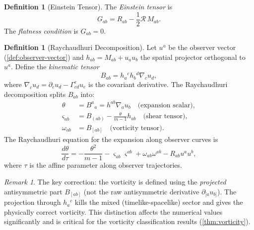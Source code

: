 \documentclass[11pt]{article}
\theoremstyle{definition}
\newtheorem{definition}[theorem]{Definition}
\theoremstyle{remark}
\newtheorem{remark}[theorem]{Remark}
\newcommand{\Met}{M}
\newcommand{\obs}{u}
\newcommand{\vort}{\omega}
\newcommand{\Chr}[2]{\Gamma^{#1}_{#2}}
\newcommand{\Ein}{G}
\newcommand{\Ric}{R}
\newcommand{\Scal}{\mathcal{R}}
\newcommand{\expan}{\theta}
\newcommand{\shear}{\varsigma} %
\begin{document}
\begin{definition}[Einstein Tensor]
\label{def:einstein}
The \emph{Einstein tensor} is
\begin{equation}
  \Ein_{ab} = \Ric_{ab} - \frac{1}{2} \Scal\, \Met_{ab}.
  \label{eq:einstein-tensor}
\end{equation}
The \emph{flatness condition} is $\Ein_{ab} = 0$.
\end{definition}

\begin{definition}[Raychaudhuri Decomposition]
\label{def:raychaudhuri}
Let $\obs^a$ be the observer vector (\cref{def:observer-vector}) and
$h_{ab} = \Met_{ab} + \obs_a \obs_b$ the spatial projector orthogonal
to $\obs^a$. Define the \emph{kinematic tensor}
\begin{equation}
  B_{ab} = h_a{}^c h_b{}^d \nabla_c \obs_d,
  \label{eq:kinematic}
\end{equation}
where $\nabla_c \obs_d = \partial_c \obs_d - \Chr{e}{cd} \obs_e$
is the covariant derivative. The Raychaudhuri decomposition splits
$B_{ab}$ into:
\begin{align}
  \expan &= B^a{}_a = h^{ab} \nabla_a \obs_b
    \quad \text{(expansion scalar)}, \label{eq:expansion}\\
  \shear_{ab} &= B_{(ab)} - \frac{\expan}{m-1} h_{ab}
    \quad \text{(shear tensor)}, \label{eq:shear}\\
  \vort_{ab} &= B_{[ab]}
    \quad \text{(vorticity tensor)}. \label{eq:vorticity}
\end{align}
The Raychaudhuri equation for the expansion along observer curves is
\begin{equation}
  \frac{d\expan}{d\tau}
  = -\frac{\expan^2}{m-1} - \shear_{ab}\shear^{ab}
    + \vort_{ab}\vort^{ab} - \Ric_{ab}\obs^a\obs^b,
  \label{eq:raychaudhuri}
\end{equation}
where $\tau$ is the affine parameter along observer trajectories.
\end{definition}

\begin{remark}
The key correction: the vorticity is defined using the \emph{projected}
antisymmetric part $B_{[ab]}$ (not the raw antisymmetric derivative
$\partial_{[a}\obs_{b]}$). The projection through $h_a{}^c$ kills the
mixed (timelike-spacelike) sector and gives the physically correct
vorticity. This distinction affects the numerical values significantly
and is critical for the vorticity classification results
(\cref{thm:vorticity}).
\end{remark}
\end{document}
